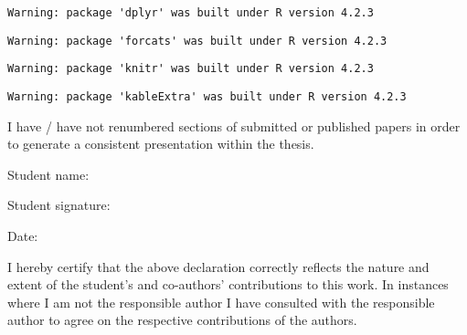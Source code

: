 \documentclass{uniexeterthesis}
\begin{document}
\begin{verbatim}
Warning: package 'dplyr' was built under R version 4.2.3
\end{verbatim}

\begin{verbatim}
Warning: package 'forcats' was built under R version 4.2.3
\end{verbatim}

\begin{verbatim}
Warning: package 'knitr' was built under R version 4.2.3
\end{verbatim}

\begin{verbatim}
Warning: package 'kableExtra' was built under R version 4.2.3
\end{verbatim}

\begingroup\fontsize{10}{12}\selectfont

\endgroup{}

I have / have not renumbered sections of submitted or published papers
in order to generate a consistent presentation within the thesis.

Student name:

Student signature:

Date:

I hereby certify that the above declaration correctly reflects the
nature and extent of the student's and co-authors' contributions to this
work. In instances where I am not the responsible author I have
consulted with the responsible author to agree on the respective
contributions of the authors.
\end{document}
